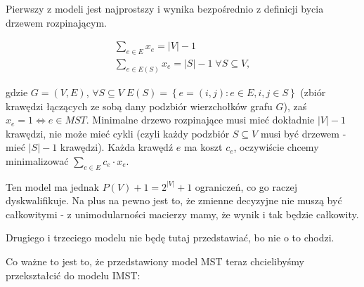 \begin{itemize}
	Pierwszy z modeli jest najprostszy i wynika bezpośrednio z definicji bycia drzewem rozpinającym.
	
	\begin{eqnarray}
	\sum_{e \in E} x_{e} = \left| V \right| - 1\\
	\sum_{e \in E \left( S \right)} x_{e} = \left| S \right| - 1 \; \forall S \subseteq V,
	\end{eqnarray}
	
	gdzie $G = \left( V, E \right)$, $\forall S \subseteq V \; E \left( S \right) = \left\{ e = \left( i, j \right) : e \in E, i, j \in S \right\}$ (zbiór krawędzi łączących ze sobą dany podzbiór wierzchołków grafu $G$), zaś $x_{e} = 1 \iff e \in MST$. Minimalne drzewo rozpinające musi mieć dokładnie $\left| V \right| - 1$ krawędzi, nie może mieć cykli (czyli każdy podzbiór $S \subseteq V$ musi być drzewem - mieć $\left| S \right| - 1$ krawędzi). Każda krawędź $e$ ma koszt $c_{e}$, oczywiście chcemy minimalizować $\sum_{e \in E} c_{e} \cdot x_{e}$.
	
	Ten model ma jednak $P \left( V \right) + 1 = 2^{\left| V \right|} + 1$ ograniczeń, co go raczej dyskwalifikuje. Na plus na pewno jest to, że zmienne decyzyjne nie muszą być całkowitymi - z unimodularności macierzy mamy, że wynik i tak będzie całkowity.
	
	Drugiego i trzeciego modelu nie będę tutaj przedstawiać, bo nie o to chodzi.
	
	Co ważne to jest to, że przedstawiony model MST teraz chcielibyśmy przekształcić do modelu IMST:


\end{itemize}
